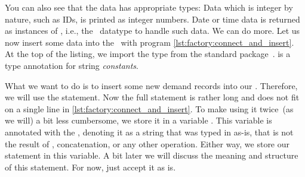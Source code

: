 You can also see that the data has appropriate types:
Data which is integer by nature, such as IDs, is printed as integer numbers.
Date or time data is returned as instances of , i.e., the \python\ datatype to handle such data.%
\FloatBarrier%
\endhsection%
%
%
%
%
%
%
%
%
%
We can do more.
Let us now insert some data into the \db\ with program \cref{lst:factory:connect_and_insert}.
At the top of the listing, we import the type  from the standard  package~\cite{PEP675}.
 is a type annotation for string \emph{constants}.

What we want to do is to insert some new demand records into our \db.
Therefore, we will use the  statement.
Now the full  statement is rather long and does not fit on a single line in \cref{lst:factory:connect_and_insert}.
To make using it twice~(as we will) a bit less cumbersome, we store it in a variable .
This variable is annotated with the  , denoting it as a string that was typed in as-is, that is not the result of , concatenation, or any other operation.
Either way, we store our statement in this variable.
A bit later we will discuss the meaning and structure of this statement.
For now, just accept it as is.


